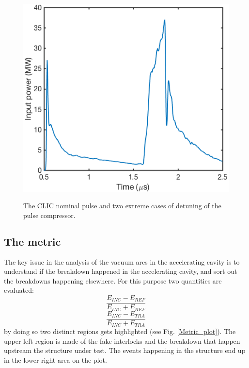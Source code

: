 \begin{figure}
   {\includegraphics[scale=0.41]{pictures/Overtuning.png}}
\caption{The CLIC nominal pulse and two extreme cases of detuning of the pulse compressor.}
 \label{detuning_fig}
 \end{figure}


\subsection[The metric]{The metric}

The key issue in the analysis of the vacuum arcs in the accelerating cavity is to understand if the breakdown happened in the accelerating cavity, and sort out the breakdowns happening elsewhere. For this purpose two quantities are evaluated:
\begin{equation}
\frac{ E_{INC} -  E_{REF}   }{  E_{INC} +  E_{REF}   }
\end{equation}
\begin{equation}
\frac{ E_{INC} -  E_{TRA}   }{  E_{INC} +  E_{TRA}   }
\end{equation}
by doing so two distinct regions gets highlighted (see Fig. \ref{Metric_plot}). The upper left region is made of the fake interlocks and the breakdown that happen upstream the structure under test. The events happening in the structure end up in the lower right area on the plot.

